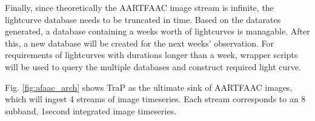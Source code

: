 \documentclass{ws-jai}
\begin{document}
Finally,  since  theoretically  the  AARTFAAC  image  stream  is  infinite,  the
lightcurve  database needs  to  be truncated  in time.  Based  on the  datarates
generated,   a   database  containing   a   weeks   worth  of   lightcurves   is
managable.  After this,  a new  database  will be  created for  the next  weeks'
observation. For requirements of lightcurves  with durations longer than a week,
wrapper  scripts will  be used  to query  the multiple  databases and  construct
required light curve.

Fig. \ref{fig:afaac_arch}  shows TraP as  the ultimate sink of  AARTFAAC images,
which will ingest 4 streams of image timeseries. Each stream corresponds to an 8
subband, 1second integrated image timeseries.

\end{document}
